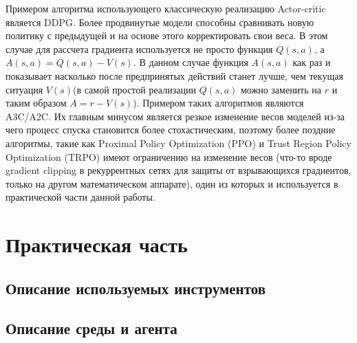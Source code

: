\documentclass[bachelor, och, coursework]{shiza}
\begin{document}
Примером алгоритма использующего классическую реализацию Actor-critic является DDPG. Более продвинутые модели способны сравнивать новую политику с предыдущей
и на основе этого корректировать свои веса. В этом случае для рассчета градиента используется не просто функция $Q(s,a)$, а $A(s,a) = Q(s,a) - V(s)$. В данном случае
функция $A(s, a)$ как раз и показывает насколько после предпринятых действий станет лучше, чем текущая ситуация $V(s)$(в самой простой реализации $Q(s,a)$ можно
заменить на $r$ и таким образом $A = r - V(s)$). Примером таких алгоритмов являются A3C/A2C. Их главным минусом является резкое изменение весов моделей из-за чего
процесс спуска становится более стохастическим, поэтому более поздние алгоритмы, такие как Proximal Policy Optimization (PPO) и Trust Region Policy Optimization (TRPO)
имеют ограничению на изменение весов (что-то вроде gradient clipping в рекуррентных сетях для защиты от взрывающихся градиентов, только на другом математическом аппарате),
один из которых и используется в практической части данной работы.

\section{Практическая часть}
\subsection{Описание используемых инструментов}
\subsection{Описание среды и агента}
\end{document}
